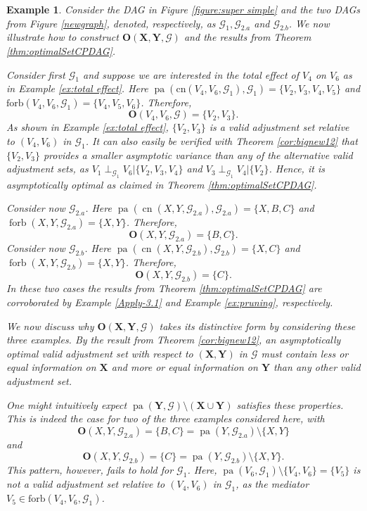 \documentclass[11pt,a4paper]{article}
\newtheorem{Example}[Satz]{Example}
\theoremstyle{definition}
\theoremstyle{remark}
\DeclareMathOperator{\Forbb}{forb}
\DeclareMathOperator{\pa}{pa}
\DeclareMathOperator{\de}{de}
\DeclareMathOperator{\CN}{cn}
\newcommand{\g}[1][G]{\mathcal{#1}}
\newcommand{\f}[2][X,Y]{\Forbb(#1,#2)}
\newcommand{\fb}[2][X,Y]{\Forbb(\mathbf{#1},#2)}
\newcommand{\cn}[2][X,Y]{\CN(#1,#2)}
\newcommand{\opt}[2][X,Y]{\mathbf{O}(#1,#2)}
\newcommand{\optb}[2][X,Y]{\mathbf{O}(\mathbf{#1},#2)}
\begin{document}
\begin{Example}
	\label{example-O}
	Consider the DAG in Figure \ref{figure:super simple} and the two DAGs from Figure \ref{newgraph}, denoted, respectively, as $\g_1, \g_{2.a}$ and $\g_{2.b}$. We now illustrate how to construct $\optb{\g}$ and the results from Theorem \ref{thm:optimalSetCPDAG}. 
	
	Consider first $\g_1$ and suppose we are interested in the total effect of $V_4$ on $V_6$ as in Example \ref{ex:total effect}. Here $\pa(\mathrm{cn}(V_4,V_6,\g_1),\g_1)=\{V_2,V_3,V_4,V_5\}$ and $\mathrm{forb}(V_4,V_6,\g_1)=\{V_4,V_5,V_6\}$. Therefore, 
	\[\mathbf{O}(V_4,V_6,\g)= \{V_2,V_3\}.\]
	As shown in Example \ref{ex:total effect}, $\{V_2,V_3\}$ is a valid adjustment set relative to $(V_4,V_6)$ in $\g_1$.
	It can also easily be verified with Theorem \ref{cor:bignew12} that $\{V_2,V_3\}$ provides a smaller asymptotic variance than any of the alternative valid adjustment sets, as $V_1 \perp_{\g_1} V_6 | \{V_2,V_3,V_4\}$ and $V_3 \perp_{\g_1} V_4 | \{V_2\}$. Hence, it is asymptotically optimal as claimed in Theorem \ref{thm:optimalSetCPDAG}.
	
	
	Consider now $\g_{2.a}$. Here $\pa(\cn{\g_{2.a}},\g_{2.a})=\{X,B,C\}$ and $\f{\g_{2.a}}=\{X,Y\}$. Therefore, \[\opt{\g_{2.a}}=\{B,C\}.\] 
	Consider now $\g_{2.b}$. Here $\pa(\cn{\g_{2.b}},\g_{2.b})=\{X,C\}$ and $\f{\g_{2.b}}=\{X,Y\}$. Therefore, \[\opt{\g_{2.b}}=\{C\}.\]
	In these two cases the results from Theorem \ref{thm:optimalSetCPDAG} are corroborated by Example \ref{Apply-3.1} and Example \ref{ex:pruning}, respectively.		
	
	We now discuss why $\optb{\g}$ takes its distinctive form by considering these three examples. By the result from Theorem \ref{cor:bignew12}, an asymptotically optimal valid adjustment set with respect to $(\mathbf{X},\mathbf{Y})$ in $\g$ must contain less or equal information on $\mathbf{X}$ and more or equal information on $\mathbf{Y}$ than any other valid adjustment set.
	
	One might intuitively expect $\pa(\mathbf{Y},\g) \setminus (\mathbf{X} \cup \mathbf{Y})$ satisfies these properties. This is indeed the case for two of the three examples considered here, with \[\opt{\g_{2.a}}=\{B,C\}=\pa(Y,\g_{2.a})\setminus \{X,Y\}\] and 
	\[\opt{\g_{2.b}}=\{C\}=\pa(Y,\g_{2.b})\setminus \{X,Y\}.\]
	This pattern, however, fails to hold for $\g_{1}$. Here, $\pa(V_6,\g_1) \setminus \{V_4,V_6\}=\{V_5\}$ is not a valid adjustment set relative to $(V_4,V_6)$ in $\g_1$, as the mediator $V_5 \in \mathrm{forb}(V_4,V_6,\g_1)$. 
	

\end{Example}
\end{document}
